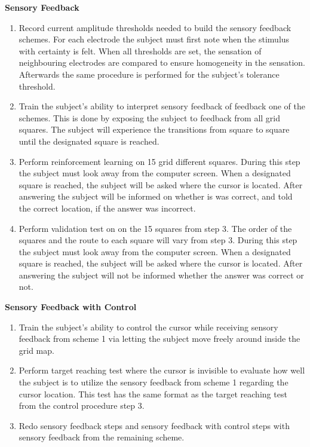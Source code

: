 \textbf{Sensory Feedback} \\
\vspace{-25pt}
\begin{enumerate}
	\item Record current amplitude thresholds needed to build the sensory feedback schemes. For each electrode the subject must first note when the stimulus with certainty is felt. When all thresholds are set, the sensation of neighbouring electrodes are compared to ensure homogeneity in the sensation. Afterwards the same procedure is performed for the subject's tolerance threshold. 
	\item Train the subject's ability to interpret sensory feedback of feedback one of the schemes. This is done  by exposing the subject to feedback from all grid squares. The subject will experience the transitions from square to square until the designated square is reached.  
	\item Perform reinforcement learning on 15 grid different squares. During this step the subject must look away from the computer screen. When a designated square is reached, the subject will be asked where the cursor is located. After answering the subject will be informed on whether is was correct, and told the correct location, if the answer was incorrect. 
	\item Perform validation test on on the 15 squares from step 3. The order of the squares and the route to each square will vary from step 3. During this step the subject must look away from the computer screen. When a designated square is reached, the subject will be asked where the cursor is located. After answering the subject will not be informed whether the answer was correct or not.
\end{enumerate}

\textbf{Sensory Feedback with Control} \\
\vspace{-25pt}
\begin{enumerate}
	\item Train the subject's ability to control the cursor while receiving sensory feedback from scheme 1 via letting the subject move freely around inside the grid map.
	\item Perform target reaching test where the cursor is invisible to evaluate how well the subject is to utilize the sensory feedback from scheme 1 regarding the cursor location. This test has the same format as the target reaching test from the control procedure step 3.
	\item Redo sensory feedback steps and sensory feedback with control steps with sensory feedback from the remaining scheme.
\end{enumerate}


